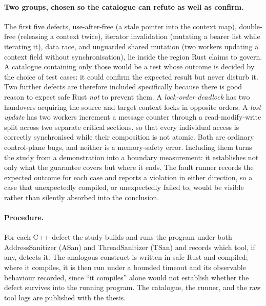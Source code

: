 \documentclass[english,twoside,openright,a4paper,censored,csm,software-track-2020]{HYthesisML}
\begin{document}
\paragraph{Two groups, chosen so the catalogue can refute as well as confirm.}
The first five defects, use-after-free (a stale pointer into the context map), double-free
(releasing a context twice), iterator invalidation (mutating a bearer list while iterating
it), data race, and unguarded shared mutation (two workers updating a context field without
synchronisation), lie inside the region Rust claims to govern. A catalogue containing only
those would be a test whose outcome is decided by the choice of test cases: it could confirm
the expected result but never disturb it. Two further defects are therefore included
specifically because there is good reason to expect safe Rust \emph{not} to prevent them. A
\emph{lock-order deadlock} has two handovers acquiring the source and target context locks in
opposite orders. A \emph{lost update} has two workers increment a message counter through a
read-modify-write split across two separate critical sections, so that every individual access
is correctly synchronised while their composition is not atomic. Both are ordinary
control-plane bugs, and neither is a memory-safety error. Including them turns the study from a
demonstration into a boundary measurement: it establishes not only what the guarantee covers
but where it ends. The fault runner records the expected outcome for each case and reports a
violation in either direction, so a case that unexpectedly compiled, or unexpectedly failed to,
would be visible rather than silently absorbed into the conclusion.

\paragraph{Procedure.}
For each C++ defect the study builds and runs the program under both AddressSanitizer (ASan)
and ThreadSanitizer (TSan) and records which tool, if any, detects it. The analogous construct
is written in safe Rust and compiled; where it compiles, it is then run under a bounded timeout
and its observable behaviour recorded, since ``it compiles'' alone would not establish whether
the defect survives into the running program. The catalogue, the runner, and the raw tool logs
are published with the thesis.
\end{document}
